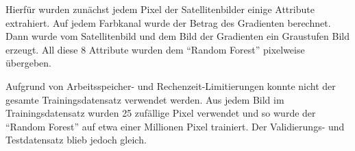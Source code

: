 Hierfür wurden zunächst jedem Pixel der Satellitenbilder einige Attribute extrahiert.
Auf jedem Farbkanal wurde der Betrag des Gradienten berechnet.
Dann wurde vom Satellitenbild und dem Bild der Gradienten ein Graustufen Bild erzeugt.
All diese 8 Attribute wurden dem \enquote{Random Forest} pixelweise übergeben.

Aufgrund von Arbeitsspeicher- und Rechenzeit-Limitierungen konnte nicht der gesamte Trainingsdatensatz verwendet werden.
Aus jedem Bild im Trainingsdatensatz wurden 25 zufällige Pixel verwendet und so wurde der \enquote{Random Forest} auf etwa einer Millionen Pixel trainiert.
Der Validierungs- und Testdatensatz blieb jedoch gleich.
